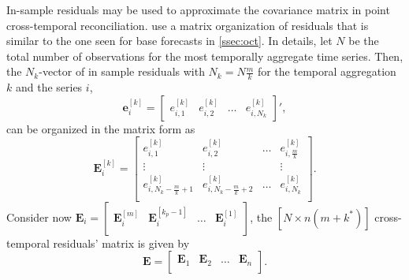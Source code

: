 \documentclass[a4paper,11pt]{article}
\newcommand{\evet}{\bm{e}}
\newcommand{\Evet}{\bm{E}}
\theoremstyle{definition}
\begin{document}
In-sample residuals may be used to approximate the covariance matrix in point cross-temporal reconciliation. \cite{difonzo2023} use a matrix organization of residuals that is similar to the one seen for base forecasts in \autoref{ssec:oct}. In details, let $N$ be the total number of observations for the most temporally aggregate time series. Then, the $N_k$-vector of in sample residuals with $N_k = N\frac{m}{k}$ for the temporal aggregation $k$ and the series $i$,
$$
	\evet_i^{[k]} = \begin{bmatrix}
		e_{i,1}^{[k]} & e_{i,2}^{[k]} & \dots & e_{i,N_k}^{[k]}
	\end{bmatrix}',
$$
can be organized in the matrix form as
\begin{equation}\label{eq:Evetki}
	\Evet_i^{[k]} = \begin{bmatrix}
		e_{i,1}^{[k]}                     & e_{i,2}^{[k]}                     & \dots & e_{i,\frac{m}{k}}^{[k]} \\
		\vdots                            & \vdots                            &       & \vdots                  \\
		e_{i,N_k - \frac{m}{k} + 1}^{[k]} & e_{i,N_k - \frac{m}{k} + 2}^{[k]} & \dots & e_{i,N_k}^{[k]}         \\
	\end{bmatrix}.
\end{equation}
Consider now $\Evet_i = \begin{bmatrix}
		\Evet_i^{[m]} & \Evet_i^{[k_p-1]} & \dots & \Evet_i^{[1]} \\
	\end{bmatrix}$, the $[N \times n(m+k^\ast)]$ cross-temporal residuals' matrix is given by
\begin{equation}
	\label{eq:Emat}
	\Evet = \begin{bmatrix}
		\Evet_1 & \Evet_2 & \dots & \Evet_n \\
	\end{bmatrix}.
\end{equation}
\end{document}

